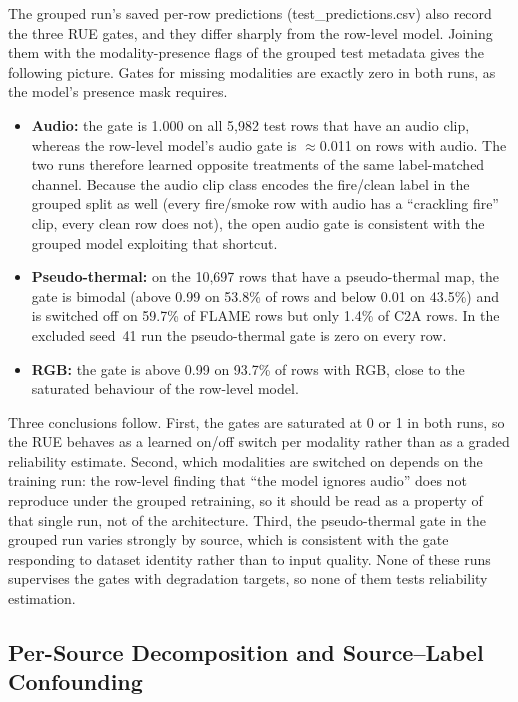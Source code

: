 The grouped run's saved per-row predictions (test\_predictions.csv) also record the three RUE gates, and they differ sharply from the row-level model. Joining them with the modality-presence flags of the grouped test metadata gives the following picture. Gates for missing modalities are exactly zero in both runs, as the model's presence mask requires.
\begin{itemize}
    \item \textbf{Audio:} the gate is 1.000 on all 5{,}982 test rows that have an audio clip, whereas the row-level model's audio gate is $\approx$0.011 on rows with audio. The two runs therefore learned opposite treatments of the same label-matched channel. Because the audio clip class encodes the fire/clean label in the grouped split as well (every fire/smoke row with audio has a ``crackling fire'' clip, every clean row does not), the open audio gate is consistent with the grouped model exploiting that shortcut.
    \item \textbf{Pseudo-thermal:} on the 10{,}697 rows that have a pseudo-thermal map, the gate is bimodal (above 0.99 on 53.8\% of rows and below 0.01 on 43.5\%) and is switched off on 59.7\% of FLAME rows but only 1.4\% of C2A rows. In the excluded seed~41 run the pseudo-thermal gate is zero on every row.
    \item \textbf{RGB:} the gate is above 0.99 on 93.7\% of rows with RGB, close to the saturated behaviour of the row-level model.
\end{itemize}
Three conclusions follow. First, the gates are saturated at 0 or 1 in both runs, so the RUE behaves as a learned on/off switch per modality rather than as a graded reliability estimate. Second, which modalities are switched on depends on the training run: the row-level finding that ``the model ignores audio'' does not reproduce under the grouped retraining, so it should be read as a property of that single run, not of the architecture. Third, the pseudo-thermal gate in the grouped run varies strongly by source, which is consistent with the gate responding to dataset identity rather than to input quality. None of these runs supervises the gates with degradation targets, so none of them tests reliability estimation.

\subsection{Per-Source Decomposition and Source--Label Confounding}
\label{sec:per_source}

